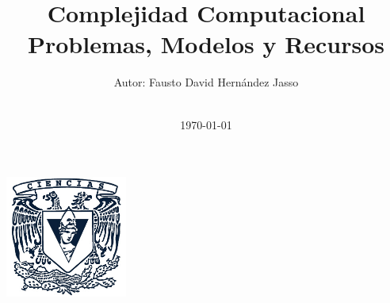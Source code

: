 \title{\Large Complejidad Computacional  \\[0.5cm]
        \bf\Large Problemas, Modelos y Recursos}
\author{\large Autor: Fausto David Hernández Jasso\\ \ \\}
\date{\large \today}

\makeatletter
    \begin{titlepage}
        \begin{center}
	   { \includegraphics[width=4cm]{facultad-de-ciencias.jpg}}
	   {\ \\ \ \\}
        \vbox{}\vspace{5cm}
            {\@title }\\[3cm] 
            {\@author}
            {\@date\\}

        \end{center}
    \end{titlepage}
\makeatother

